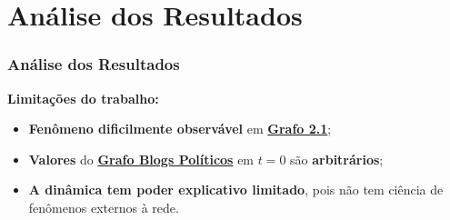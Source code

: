 
\section{Análise dos Resultados}

\begin{frame}
  \frametitle{Análise dos Resultados}

  \textbf{Limitações do trabalho:}

  \begin{alertblock}{}
    \vspace{5mm}

    \begin{itemize}
      \item \textbf{\alert{Fenômeno dificilmente observável}} em
        \hyperlink{page.21}{\textbf{Grafo 2.1}};
      \vspace{5mm}

      \item \textbf{\alert{Valores}} do \hyperlink{page.21}{\textbf{Grafo Blogs Políticos}}
        em $t = 0$ são \textbf{\alert{arbitrários}};
      \vspace{5mm}

      \item \textbf{\alert{A dinâmica tem poder explicativo limitado}}, pois não
        tem ciência de fenômenos externos à rede.
    \end{itemize}
    \vspace{5mm}

  \end{alertblock}
\end{frame}
